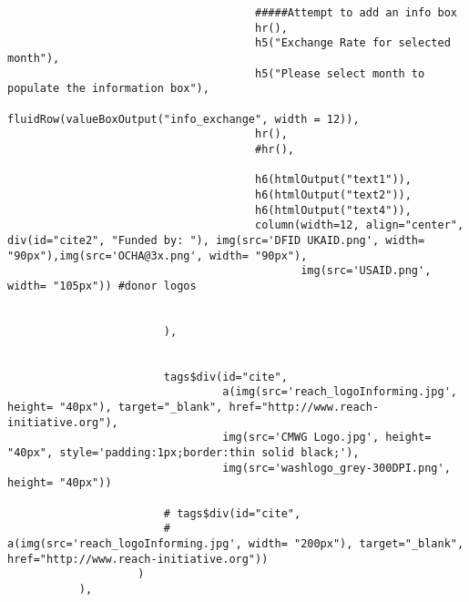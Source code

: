 \documentclass[
]{article}
\begin{document}
\begin{verbatim}
                                      #####Attempt to add an info box
                                      hr(),
                                      h5("Exchange Rate for selected month"),
                                      h5("Please select month to populate the information box"),
                                      fluidRow(valueBoxOutput("info_exchange", width = 12)),
                                      hr(),
                                      #hr(),
                                      
                                      h6(htmlOutput("text1")),
                                      h6(htmlOutput("text2")),
                                      h6(htmlOutput("text4")),
                                      column(width=12, align="center", div(id="cite2", "Funded by: "), img(src='DFID UKAID.png', width= "90px"),img(src='OCHA@3x.png', width= "90px"),
                                             img(src='USAID.png', width= "105px")) #donor logos
                                      
                                      
                        ),
                        
                        
                        tags$div(id="cite",
                                 a(img(src='reach_logoInforming.jpg', height= "40px"), target="_blank", href="http://www.reach-initiative.org"),
                                 img(src='CMWG Logo.jpg', height= "40px", style='padding:1px;border:thin solid black;'),
                                 img(src='washlogo_grey-300DPI.png', height= "40px"))

                        # tags$div(id="cite",
                        #          a(img(src='reach_logoInforming.jpg', width= "200px"), target="_blank", href="http://www.reach-initiative.org"))
                    )
           ),
\end{verbatim}
\end{document}
